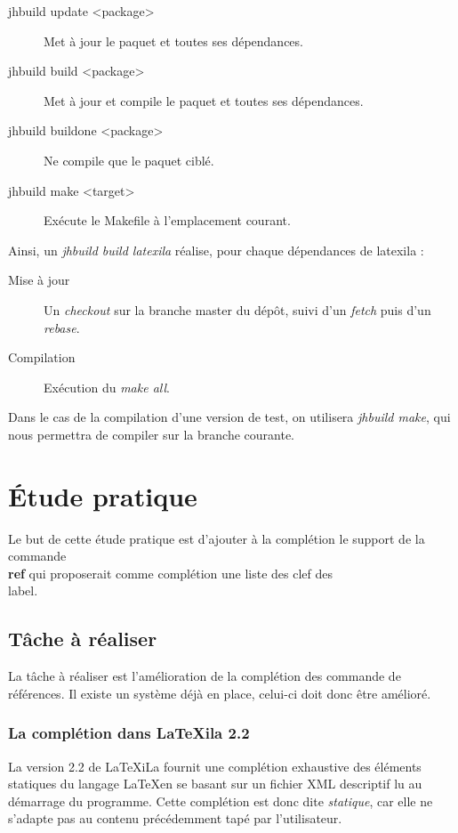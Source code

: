 \documentclass[a4paper,11pt]{report}
\begin{document}
\begin{description}
  \item[jhbuild update <package>] Met à jour le paquet et toutes ses dépendances.
  \item[jhbuild build <package>] Met à jour et compile le paquet et toutes ses dépendances.
  \item[jhbuild buildone <package>] Ne compile que le paquet ciblé.
  \item[jhbuild make <target>] Exécute le Makefile à l'emplacement courant.
\end{description}

Ainsi, un \textit{jhbuild build latexila} réalise, pour chaque dépendances de latexila :

\begin{description} 
  \item[Mise à jour] Un \textit{checkout} sur la branche master du dépôt, suivi d'un \textit{fetch} puis d'un \textit{rebase}.
  \item[Compilation] Exécution du \textit{make all}.
\end{description}

Dans le cas de la compilation d'une version de test, on utilisera \textit{jhbuild make}, qui nous permettra de compiler sur la branche courante.

\chapter{Étude pratique} %
\label{cha:etude_pratique}
Le but de cette étude pratique est d'ajouter à la complétion le support de la commande \textbf{\\ref} qui proposerait comme complétion une liste des clef des \\label.

\section{Tâche à réaliser} %
\label{sec:tache_a_realiser}
La tâche à réaliser est l'amélioration de la complétion des commande de références. Il existe un système déjà en place, celui-ci doit donc être amélioré.

\subsection{La complétion dans LaTeXila 2.2}
\label{sub:completion}
La version 2.2 de LaTeXiLa fournit une complétion exhaustive des éléments statiques du langage \LaTeX  en se basant sur un fichier XML descriptif lu au démarrage du programme.
Cette complétion est donc dite \textit{statique}, car elle ne s'adapte pas au contenu précédemment tapé par l'utilisateur. 
\end{document}
